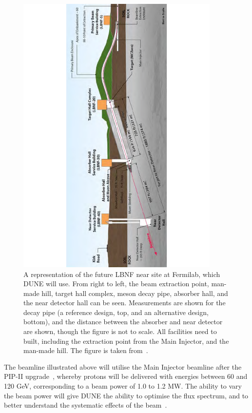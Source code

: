 \begin{figure}[h!]
  \centering
  \includegraphics[width=0.9\textwidth]{NearDetectorComplex}
  \caption[A representation of the future LBNF near site at Fermilab, which DUNE will use]
          {A representation of the future LBNF near site at Fermilab, which DUNE will use. From right to left, the beam extraction point, man-made hill, target hall complex, meson decay pipe, absorber hall, and the near detector hall can be seen. Measurements are shown for the decay pipe (a reference design, top, and an alternative design, bottom), and the distance between the absorber and near detector are shown, though the figure is not to scale. All facilities need to built, including the extraction point from the Main Injector, and the man-made hill. The figure is taken from~\citep{DUNECDR_V3}.}
  \label{fig:DUNENearDetectorComplex}
\end{figure}

The beamline illustrated above will utilise the Main Injector beamline after the PIP-II upgrade~\citep{PIP-II}, whereby protons will be delivered with energies between 60 and 120 GeV, corresponding to a beam power of 1.0 to 1.2 MW. The ability to vary the beam power will give DUNE the ability to optimise the flux spectrum, and to better understand the systematic effects of the beam~\citep{DUNECDR_V1}. \\

